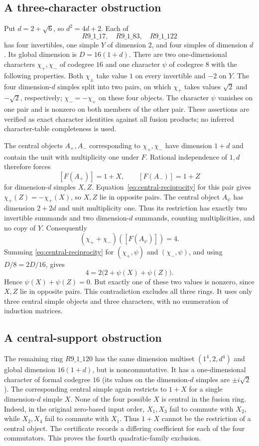 \subsection{A three-character obstruction}
Put $d=2+\sqrt6$, so $d^2=4d+2$. Each of
\[
 R9\_1\_17,\quad R9\_1\_83,\quad R9\_1\_122
\]
has four invertibles, one simple $Y$ of dimension $2$, and four simples
of dimension $d$. Its global dimension is $D=16(1+d)$.
There are two one-dimensional characters $\chi_+,\chi_-$ of codegree
$16$ and one character $\psi$ of codegree $8$ with the following
properties. Both $\chi_\pm$ take value $1$ on every invertible and $-2$
on $Y$. The four dimension-$d$ simples split into two pairs, on which
$\chi_+$ takes values $\sqrt2$ and $-\sqrt2$, respectively;
$\chi_-=-\chi_+$ on these four objects. The character $\psi$ vanishes
on one pair and is nonzero on both members of the other pair.
These assertions are verified as exact character identities against
all fusion products; no inferred character-table completeness is used.

The central objects $A_+,A_-$ corresponding to $\chi_+,\chi_-$ have
dimension $1+d$ and contain the unit with multiplicity one under $F$.
Rational independence of $1,d$ therefore forces
\[
 [F(A_+)]=1+X,\qquad [F(A_-)]=1+Z
\]
for dimension-$d$ simples $X,Z$. Equation~\eqref{eq:central-reciprocity}
for this pair gives $\chi_+(Z)=-\chi_+(X)$, so $X,Z$ lie in opposite
pairs. The central object $A_\psi$ has dimension $2+2d$ and unit
multiplicity one. Thus its restriction has exactly two invertible
summands and two dimension-$d$ summands, counting multiplicities,
and no copy of $Y$. Consequently
\[
 (\chi_++\chi_-)([F(A_\psi)])=4.
\]
Summing \eqref{eq:central-reciprocity} for $(\chi_+,\psi)$ and
$(\chi_-,\psi)$, and using $D/8=2D/16$, gives
\[
 4=2\bigl(2+\psi(X)+\psi(Z)\bigr).
\]
Hence $\psi(X)+\psi(Z)=0$. But exactly one of these two values is
nonzero, since $X,Z$ lie in opposite pairs. This contradiction excludes
all three rings. It uses only three central simple objects and three
characters, with no enumeration of induction matrices.

\subsection{A central-support obstruction}
The remaining ring $R9\_1\_120$ has the same dimension multiset
$(1^4,2,d^4)$ and global dimension $16(1+d)$, but is noncommutative.
It has a one-dimensional character of formal codegree $16$ (its values
on the dimension-$d$ simples are $\pm i\sqrt2$).
The corresponding central simple again restricts to $1+X$ for a single
dimension-$d$ simple $X$. None of the four possible $X$ is central in
the fusion ring. Indeed, in the original zero-based input order,
$X_1,X_3$ fail to commute with $X_2$, while $X_2,X_4$ fail to commute
with $X_1$. Thus $1+X$ cannot be the restriction of a central object.
The certificate records a differing coefficient for each of the four
commutators. This proves the fourth quadratic-family exclusion.

